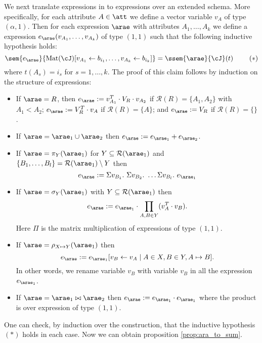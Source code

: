 We next translate \rak expressions in to \langsum expressions over an extended schema. More specifically, for each attribute $A \in \att$ we define a vector variable $v_A$ of type $(\alpha,1)$. Then for each \rak expression $\arae$ with attributes $A_1, \ldots, A_k$ we define a \langsum expression $\earae(v_{A_1}, \ldots, v_{A_k})$ of type $(1,1)$ such that the following inductive hypothesis holds:
$$
\sem{\earae}{\text{Mat}(\cJ)[v_{A_1} \gets b_{i_1},\ldots, v_{A_k} \gets b_{i_k}]} = 
\ssem{\arae}{\cJ}(t) \ \ \ \ \ \ \  (*)
$$
where $t(A_s)=i_s$ for $s=1,\ldots, k$. The proof of this claim follows by induction on the structure of expressions:
\begin{itemize} \itemsep3mm
	\item If $\arae=R$, then $\earae:=v_{A_1}^T \cdot V_R \cdot v_{A_2}$ if $\mathcal{R}(R)=\{A_1,A_2\}$ with $A_1<A_2$; 
	$\earae:=V_R^T \cdot v_A$ if $\mathcal{R}(R)=\{A\}$; and 
	$\earae:=V_R$ if $\mathcal{R}(R)=\{\}$.
	\item If $\arae=\arae_1\cup \arae_2$ then
	$\earae:=e_{\arae_1} + e_{\arae_2}$.
	\item If $\arae=\pi_{Y}(\arae_1)$ for $Y\subseteq \mathcal{R}(\arae_1)$ and $\{B_1, \ldots, B_l\} = \mathcal{R}(\arae_1) \setminus Y$ then
	$$
	\earae:= \Sigma v_{B_1}. \ \Sigma v_{B_2}. \ \ldots \Sigma v_{B_l}. \ e_{\arae_1}
	$$
	\item If $\arae=\sigma_{Y}(\arae_1)$ with $Y\subseteq\mathcal{R}(\arae_1)$ then
	$$
	\earae:=e_{\arae_1}\cdot \prod_{A,B\in Y} (v_{A}^T \cdot v_{B}).
	$$
	Here $\Pi$ is the matrix multiplication of expressions of type $(1,1)$.
	\item If $\arae=\rho_{X\mapsto Y}(\arae_1)$ then
	$$\earae:=e_{\arae_1}[v_B\gets v_A\mid A\in X, B\in Y, A\mapsto B].$$
	In other words, we rename variable $v_B$ with variable $v_B$ in all the expression $e_{\arae_1}$. 
	\item If $\arae=\arae_1\bowtie \arae_2$ then
	$\earae:=e_{\arae_1} \cdot e_{\arae_1}$ where the product is over expression of type $(1,1)$.
\end{itemize}
One can check, by induction over the construction, that the inductive hypothesis $(*)$ holds in each case.
Now we can obtain proposition \ref{prop:ara_to_sum}.

\newtheorem*{ARATOSUM}{Proposition~\ref{prop:ara_to_sum}}

